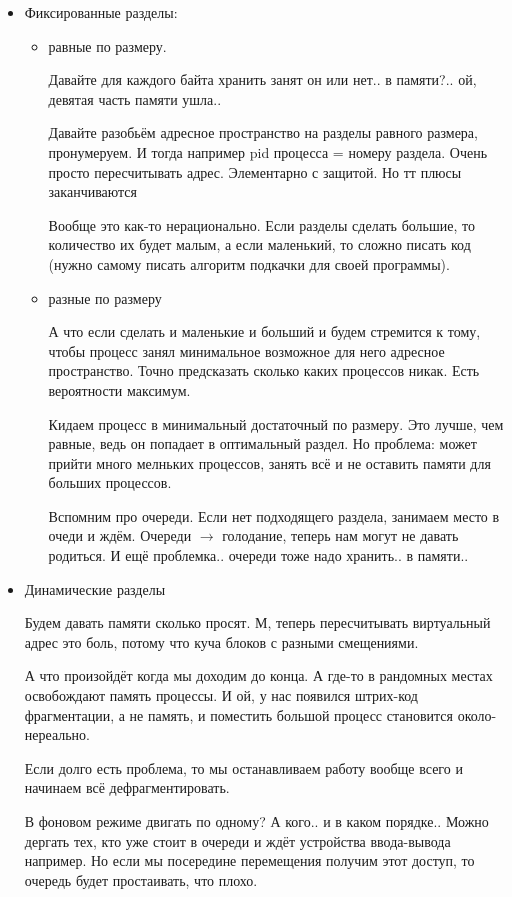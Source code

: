 \documentclass{book}
\theoremstyle{definition}
\begin{document}
\begin{itemize}
    \item Фиксированные разделы:
        \begin{itemize}
            \item равные по размеру.

                Давайте для каждого байта хранить занят он или нет.. в памяти?.. ой, девятая часть памяти ушла..

                Давайте разобьём адресное пространство на разделы равного размера, пронумеруем. И тогда например pid процесса = номеру раздела. Очень просто пересчитывать адрес. Элементарно с защитой. Но тт плюсы заканчиваются

                Вообще это как-то нерационально. Если разделы сделать большие, то количество их будет малым, а если маленький, то сложно писать код (нужно самому писать алгоритм подкачки для своей программы). 
            \item разные по размеру

                А что если сделать и маленькие и больший и будем стремится к тому, чтобы процесс занял минимальное возможное для него адресное пространство. Точно предсказать сколько каких процессов никак. Есть вероятности максимум. 

                Кидаем процесс в минимальный достаточный по размеру. Это лучше, чем равные, ведь он попадает в оптимальный  раздел. Но проблема: может прийти много мелньких процессов, занять всё и не оставить памяти для больших процессов.

                Вспомним про очереди. Если нет подходящего раздела, занимаем место в очеди и ждём. Очереди $\to $ голодание, теперь нам могут не давать родиться. И ещё проблемка.. очереди тоже надо хранить.. в памяти..
        \end{itemize}
    \item Динамические разделы

        Будем давать памяти сколько просят. М, теперь пересчитывать виртуальный адрес это боль, потому что куча блоков с разными смещениями. 

        А что произойдёт когда мы доходим до конца. А где-то в рандомных местах освобождают память процессы. И ой, у нас появился штрих-код фрагментации, а не память, и поместить большой процесс становится около-нереально. 

        Если долго есть проблема, то мы останавливаем работу вообще всего и начинаем всё дефрагментировать.

        В фоновом режиме двигать по одному? А кого.. и в каком порядке.. Можно дергать тех, кто уже стоит в очереди и ждёт устройства ввода-вывода например. Но если мы посередине перемещения получим этот доступ, то очередь будет простаивать, что плохо.
\end{itemize}
\end{document}
